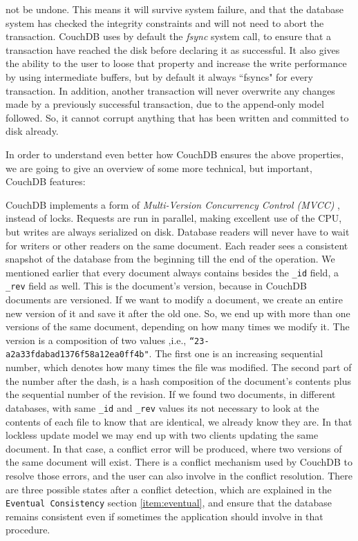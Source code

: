 \begin{description}
\begin{itemize}
      not be undone.
      This means it will survive system failure, and that the database system
      has checked the integrity constraints and will not need to abort the
      transaction. CouchDB uses by default the \emph{fsync} system call, to
      ensure that a transaction have reached the disk before declaring it as
      successful. It also gives the ability to the user to loose that property
      and increase the write performance by using intermediate buffers, but by
      default it always ``fsyncs" for every transaction. In addition, another
      transaction will never overwrite any changes made by a previously
      successful transaction, due to the append-only model followed. So, it
      cannot corrupt anything that has been written and committed to disk
      already.
    \end{itemize}

    In order to understand even better how CouchDB ensures the above properties,
    we are going to give an overview of some more technical, but important,
    CouchDB features:

    CouchDB implements a form of \emph{Multi-Version Concurrency Control (MVCC)}
    ,
    instead of locks. Requests are run in parallel, making excellent use of the
    CPU, but writes are always serialized on disk. Database readers will never
    have to wait for writers or other readers on the same document. Each reader
    sees a consistent snapshot of the database from the beginning till the end
    of the operation. We mentioned earlier that every document always contains
    besides the \texttt{\_id} field, a \texttt{\_rev} field as well. This is the
    document's version, because in CouchDB documents are versioned. If we want to
    modify a document, we create an entire new version of it and save
    it after the old one. So, we end up with more than one versions of the same
    document, depending on how many times we modify it. The version is a
    composition of two values ,i.e., \texttt{``23-a2a33fdabad1376f58a12ea0ff4b"}.
    The first one is an increasing sequential number, which denotes how many
    times the file was modified. The second part of the number after the dash,
    is a hash composition of the document's contents plus the sequential number
    of the revision. If we found two documents, in different databases, with
    same \texttt{\_id} and \texttt{\_rev} values its not necessary to look at the
    contents of each file to know that are identical, we already know they are.
    In that lockless update model we may end up with two clients updating the
    same document. In that case, a  conflict error will be produced, where two
    versions of the same document will exist. There is a conflict mechanism used
    by CouchDB to resolve those errors, and the user can also involve in the
    conflict resolution. There are three possible states after a conflict
    detection, which are explained in the \texttt{Eventual Consistency} section
    \ref{item:eventual}, and ensure that the database remains consistent even if
    sometimes the application should involve in that procedure.


\end{description}
